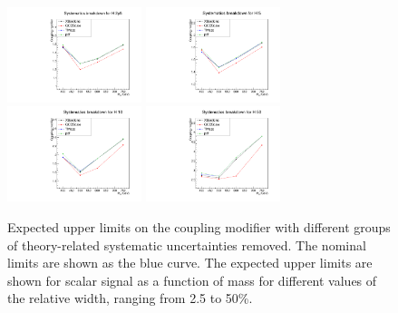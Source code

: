\begin{figure}[!Hhtb]
\centering
\includegraphics[width=0.35\textwidth,keepaspectratio=true]{fig/app5/breakdowns/theory_breakdown_H_2p5.pdf}
\includegraphics[width=0.35\textwidth,keepaspectratio=true]{fig/app5/breakdowns/theory_breakdown_H_5.pdf}
\includegraphics[width=0.35\textwidth,keepaspectratio=true]{fig/app5/breakdowns/theory_breakdown_H_10.pdf}
\includegraphics[width=0.35\textwidth,keepaspectratio=true]{fig/app5/breakdowns/theory_breakdown_H_50.pdf}
\caption{Expected upper limits on the coupling modifier with different groups of theory-related systematic uncertainties removed. The nominal limits are shown as the blue curve. The expected upper limits are shown for scalar signal as a function of mass for different values of the relative width, ranging from 2.5 to 50\%.}
\label{fig:theory_breakdown_hwidths}
\end{figure}

